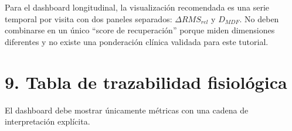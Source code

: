 \documentclass[
  spanish,
  a4paper,
  DIV=11,
  numbers=noendperiod]{scrreprt}
\begin{document}
\begin{tcolorbox}[enhanced jigsaw, arc=.35mm, bottomrule=.15mm, bottomtitle=1mm, breakable, colback=white, colbacktitle=quarto-callout-tip-color!10!white, colframe=quarto-callout-tip-color-frame, coltitle=black, left=2mm, leftrule=.75mm, opacityback=0, opacitybacktitle=0.6, rightrule=.15mm, title=\textcolor{quarto-callout-tip-color}{\faLightbulb}\hspace{0.5em}{Decisión de ingeniería}, titlerule=0mm, toprule=.15mm, toptitle=1mm]

Para el dashboard longitudinal, la visualización recomendada es una
serie temporal por visita con dos paneles separados:
\(\Delta RMS_{rel}\) y \(D_{MDF}\). No deben combinarse en un único
``score de recuperación'' porque miden dimensiones diferentes y no
existe una ponderación clínica validada para este tutorial.

\end{tcolorbox}

\chapter{9. Tabla de trazabilidad
fisiológica}\label{tabla-de-trazabilidad-fisioluxf3gica}

El dashboard debe mostrar únicamente métricas con una cadena de
interpretación explícita.
\end{document}

